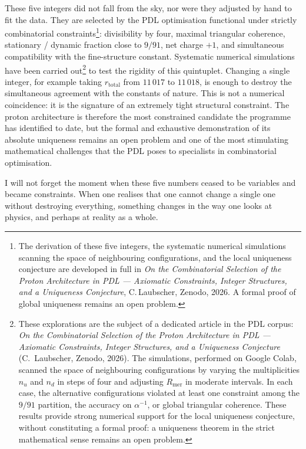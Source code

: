 \documentclass[12pt, a4paper, openright]{book}
\begin{document}
\medskip

These five integers did not fall from the sky, nor were they adjusted by hand to fit the data. They are selected by the PDL optimisation functional under strictly combinatorial constraints\footnote{The derivation of these five integers, the systematic numerical simulations scanning the space of neighbouring configurations, and the local uniqueness conjecture are developed in full in \textit{On the Combinatorial Selection of the Proton Architecture in PDL --- Axiomatic Constraints, Integer Structures, and a Uniqueness Conjecture}, C.\,Laubscher, Zenodo, 2026. A formal proof of global uniqueness remains an open problem.}: divisibility by four, maximal triangular coherence, stationary / dynamic fraction close to $9/91$, net charge $+1$, and simultaneous compatibility with the fine-structure constant. Systematic numerical simulations have been carried out\footnote{These explorations are the subject of a dedicated article in the PDL corpus: \emph{On the Combinatorial Selection of the Proton Architecture in PDL --- Axiomatic Constraints, Integer Structures, and a Uniqueness Conjecture} (C.~Laubscher, Zenodo, 2026). The simulations, performed on Google Colab, scanned the space of neighbouring configurations by varying the multiplicities $n_u$ and $n_d$ in steps of four and adjusting $R_\text{mer}$ in moderate intervals. In each case, the alternative configurations violated at least one constraint among the $9/91$ partition, the accuracy on $\alpha^{-1}$, or global triangular coherence. These results provide strong numerical support for the local uniqueness conjecture, without constituting a formal proof: a uniqueness theorem in the strict mathematical sense remains an open problem.} to test the rigidity of this quintuplet. Changing a single integer, for example taking $r_\text{total}$ from $11\,017$ to $11\,018$, is enough to destroy the simultaneous agreement with the constants of nature. This is not a numerical coincidence: it is the signature of an extremely tight structural constraint. The proton architecture is therefore the most constrained candidate the programme has identified to date, but the formal and exhaustive demonstration of its absolute uniqueness remains an open problem and one of the most stimulating mathematical challenges that the PDL poses to specialists in combinatorial optimisation.

\medskip

I will not forget the moment when these five numbers ceased to be variables and became constraints. When one realises that one cannot change a single one without destroying everything, something changes in the way one looks at physics, and perhaps at reality as a whole.
\end{document}
